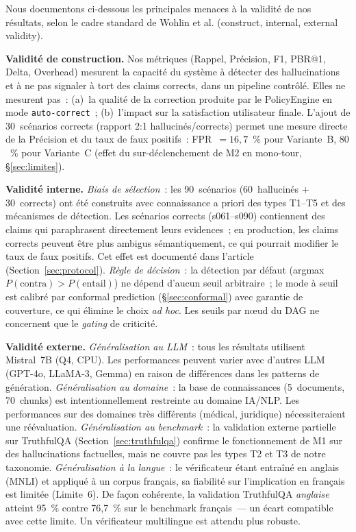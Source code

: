 \documentclass[12pt,a4paper]{article}
\begin{document}
Nous documentons ci-dessous les principales menaces à la validité de nos résultats, selon le cadre standard de Wohlin et al. (construct, internal, external validity).

\textbf{Validité de construction.}
Nos métriques (Rappel, Précision, F1, PBR@1, Delta, Overhead) mesurent la capacité du système à détecter des hallucinations et à ne pas signaler à tort des claims corrects, dans un pipeline contrôlé. Elles ne mesurent pas~: (a)~la qualité de la correction produite par le PolicyEngine en mode \texttt{auto-correct}~; (b)~l'impact sur la satisfaction utilisateur finale.
L'ajout de 30~scénarios corrects (rapport 2:1 hallucinés/corrects) permet une mesure directe de la Précision et du taux de faux positifs~: FPR~$=16{,}7$~\% pour Variante~B, $80$~\% pour Variante~C (effet du sur-déclenchement de M2 en mono-tour, §\ref{sec:limites}).

\textbf{Validité interne.}
\textit{Biais de sélection}~: les 90~scénarios (60~hallucinés + 30~corrects) ont été construits avec connaissance a priori des types T1--T5 et des mécanismes de détection. Les scénarios corrects (s061--s090) contiennent des claims qui paraphrasent directement leurs evidences~; en production, les claims corrects peuvent être plus ambigus sémantiquement, ce qui pourrait modifier le taux de faux positifs. Cet effet est documenté dans l'article (Section~\ref{sec:protocol}).
\textit{Règle de décision}~: la détection par défaut (argmax $P(\text{contra}) > P(\text{entail})$) ne dépend d'aucun seuil arbitraire~; le mode à seuil est calibré par conformal prediction (§\ref{sec:conformal}) avec garantie de couverture, ce qui élimine le choix \textit{ad hoc}. Les seuils par nœud du DAG ne concernent que le \textit{gating} de criticité.

\textbf{Validité externe.}
\textit{Généralisation au LLM}~: tous les résultats utilisent Mistral~7B (Q4, CPU). Les performances peuvent varier avec d'autres LLM (GPT-4o, LLaMA-3, Gemma) en raison de différences dans les patterns de génération.
\textit{Généralisation au domaine}~: la base de connaissances (5~documents, 70~chunks) est intentionnellement restreinte au domaine IA/NLP. Les performances sur des domaines très différents (médical, juridique) nécessiteraient une réévaluation.
\textit{Généralisation au benchmark}~: la validation externe partielle sur TruthfulQA (Section~\ref{sec:truthfulqa}) confirme le fonctionnement de M1 sur des hallucinations factuelles, mais ne couvre pas les types T2 et T3 de notre taxonomie.
\textit{Généralisation à la langue}~: le vérificateur étant entraîné en anglais (MNLI) et appliqué à un corpus français, sa fiabilité sur l'implication en français est limitée (Limite~6). De façon cohérente, la validation TruthfulQA \emph{anglaise} atteint 95~\% contre 76,7~\% sur le benchmark français~--- un écart compatible avec cette limite. Un vérificateur multilingue est attendu plus robuste.
\end{document}
